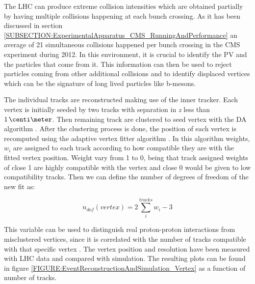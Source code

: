 
The \gls{LHC} can produce extreme collision intensities which are obtained partially by having multiple collisions happening at each bunch crossing. As it has been discussed in section \ref{SUBSECTION:ExperimentalApparatus_CMS_RunningAndPerformance} an average of 21 simultaneous collisions happened per bunch crossing in the \gls{CMS} experiment during 2012. In this environment, it is crucial to identify the \gls{PV} and the particles that come from it. This information can then be used to reject particles coming from other additional collisions and to identify displaced vertices which can be the signature of long lived particles like b-mesons.

The individual tracks are reconstructed making use of the inner tracker. Each vertex is initially seeded by two tracks with separation in \textit{z} less than $1\,\centi\meter$. Then remaining track are clustered to seed vertex with the \gls{DA} algorithm \cite{ARTICLE:DeterministicAnnealing}. After the clustering process is done, the position of each vertex is recomputed using the adaptive vertex fitter algorithm \cite{ARTICLE:AdaptiveVertexFitting}. In this algorithm weights, $w_{i}$ are assigned to each track according to how compatible they are with the fitted vertex position. Weight vary from 1 to 0, being that track assigned weights of close 1 are highly compatible with the vertex and close 0 would be given to low compatibility tracks. Then we can define the number of degrees of freedom of the new fit as:

\begin{equation}
n_{dof}(vertex)=2\sum\limits_{i}^{tracks} w_i - 3
\end{equation}

This variable can be used to distinguish real proton-proton interactions from misclustered vertices, since it is correlated with the number of tracks compatible with that specific vertex \cite{ARTICLE:CMSTrackingAndPrimaryVertex}. The vertex position and resolution have been measured with \gls{LHC} data and compared with simulation. The resulting plots can be found in figure \ref{FIGURE:EventReconstructionAndSimulation_Vertex} as a function of number of tracks.

